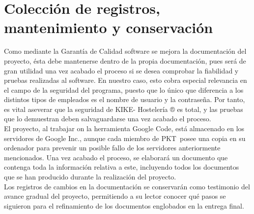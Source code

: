 \documentclass[spanish,a4paper,11pt, twoside]{report}	%
\newcommand*{\PKT}{\hbox{P}\kern-2.5pt\lower3.5pt\hbox{\small{K}}\kern-2.8pt\hbox{T}\kern-2pt}	%
\begin{document}


\chapter{ Colección de registros, mantenimiento y conservación}

	Como mediante la Garantía de Calidad software se mejora la documentación del proyecto, ésta debe mantenerse dentro de la propia documentación, pues será de gran utilidad una vez acabado el proceso si se desea comprobar la fiabilidad y pruebas realizadas al software. En nuestro caso, esto cobra especial relevancia en el campo de la seguridad del programa, puesto que lo único que diferencia a los distintos tipos de empleados es el nombre de usuario y la contraseña. Por tanto, es vital aseverar que la seguridad de KIKE- Hostelería ® es total, y las pruebas que lo demuestran deben salvaguardarse una vez acabado el proceso.\\

El proyecto, al trabajar on la herramienta Google Code, está almacenado en los servidores de Google Inc., aunque cada miembro de \PKT \ posee una copia en su ordenador para prevenir un posible fallo de los servidores anteriormente mencionados. Una vez acabado el proceso, se elaborará un documento que contenga toda la información relativa a este, incluyendo todos los documentos que se han producido durante la realización del proyecto. \\

Los registros de cambios en la documentación se conservarán como testimonio del avance gradual del proyecto, permitiendo a su lector conocer qué pasos se siguieron para el refinamiento de los documentos englobados en la entrega final.


\newpage
\mbox{}
\thispagestyle{empty}						%
\newpage
\end{document}
